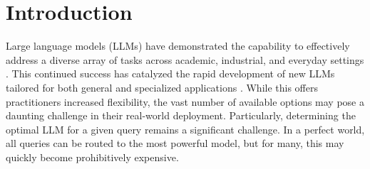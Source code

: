 \section{Introduction}
\label{sec:intro}






Large language models (LLMs) have demonstrated the capability to effectively address a diverse array of tasks across academic, industrial, and everyday settings \citep{minaee2024large}. This continued success has catalyzed the rapid development of new LLMs tailored for both general and specialized applications \citep{myrzakhan2024open}. While %
this offers practitioners increased flexibility, the vast number of available options may pose a daunting challenge in their real-world deployment. Particularly, determining the optimal LLM for a given query remains a significant challenge. In a perfect world, all queries can be routed to the most powerful model, but for many, this may quickly become prohibitively expensive.





